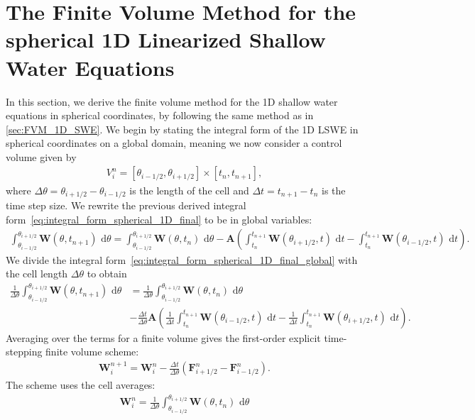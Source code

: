 \section{The Finite Volume Method for the spherical 1D Linearized Shallow Water Equations}
In this section, we derive the finite volume method for the 1D shallow water equations in spherical coordinates, by following the same method as in \autoref{sec:FVM_1D_SWE}.
We begin by stating the integral form of the 1D LSWE in spherical coordinates on a global domain, meaning we now consider a control volume given by 
\begin{align*}
    V_i^n = [\theta_{i-1/2}, \theta_{i+1/2}] \times [t_n, t_{n+1}],
\end{align*}
where $\Delta \theta = \theta_{i+1/2} - \theta_{i-1/2}$ is the length of the cell and $\Delta t = t_{n+1} - t_n$ is the time step size.
We rewrite the previous derived integral form~\eqref{eq:integral_form_spherical_1D_final} to be in global variables:
\begin{align}\label{eq:integral_form_spherical_1D_final_global}
    \int_{\theta_{i-1/2}}^{\theta_{i+1/2}} \mathbf{W}(\theta, t_{n+1}) \text{ d}\theta = \int_{\theta_{i-1/2}}^{\theta_{i+1/2}} \mathbf{W}(\theta, t_n) \text{ d}\theta
    - \mathbf{A} \left( \int_{t_n}^{t_{n+1}} \mathbf{W}(\theta_{i+1/2}, t) \text{ d}t - \int_{t_n}^{t_{n+1}} \mathbf{W}(\theta_{i-1/2}, t) \text{ d}t \right).
\end{align}
We divide the integral form~\eqref{eq:integral_form_spherical_1D_final_global} with the cell length $\Delta \theta$ to obtain
\begin{align*}
    \frac{1}{\Delta \theta} \int_{\theta_{i-1/2}}^{\theta_{i+1/2}} \mathbf{W}(\theta, t_{n+1}) \text{ d}\theta &=
    \frac{1}{\Delta \theta} \int_{\theta_{i-1/2}}^{\theta_{i+1/2}} \mathbf{W}(\theta, t_n) \text{ d}\theta \\
    &- \frac{\Delta t}{\Delta \theta} \mathbf{A} \left( \frac{1}{\Delta t} \int_{t_n}^{t_{n+1}} \mathbf{W}(\theta_{i-1/2}, t) \text{ d}t - \frac{1}{\Delta t} \int_{t_n}^{t_{n+1}} \mathbf{W}(\theta_{i+1/2}, t) \text{ d}t\right) .
\end{align*}
Averaging over the terms for a finite volume gives the first-order explicit time-stepping finite volume scheme:
\begin{align}
    \mathbf{W}_i^{n+1} = \mathbf{W}_i^n - \frac{\Delta t}{\Delta \theta} (\mathbf{F}_{i+1/2}^n - \mathbf{F}_{i-1/2}^n).
\end{align}
The scheme uses the cell averages:
\begin{align*}
    \mathbf{W}_i^{n} = \frac{1}{\Delta \theta} \int_{\theta_{i-1/2}}^{\theta_{i+1/2}} \mathbf{W}(\theta, t_n) \text{ d}\theta
\end{align*}
